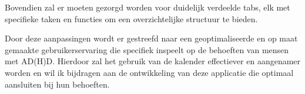 Bovendien zal er moeten gezorgd worden voor duidelijk verdeelde tabs, elk met specifieke taken en functies om een overzichtelijke structuur te bieden. \newline
 
Door deze aanpassingen wordt er gestreefd naar een geoptimaliseerde en op maat gemaakte gebruikerservaring die specifiek inspeelt op de behoeften van mensen met AD(H)D. Hierdoor zal het gebruik van de kalender effectiever en aangenamer worden en wil ik bijdragen aan de ontwikkeling van deze applicatie die optimaal aansluiten bij hun behoeften.

